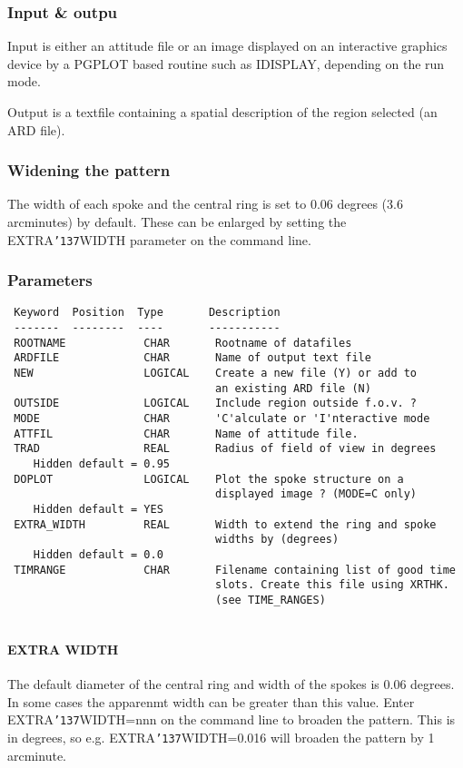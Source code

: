 \documentclass{book}
\renewcommand{\_}{{\tt\char'137}}     %
\begin{document}
\subsubsection{Input \& outpu}
Input is either an attitude file or an image displayed on an
interactive graphics device by a PGPLOT based routine such as IDISPLAY,
depending on the run mode.
 
Output is a textfile containing a spatial description of the region
selected (an ARD file).
 
\subsubsection{Widening the pattern}
The width of each spoke and the central ring is set to 0.06
degrees (3.6 arcminutes) by default. These can be enlarged by setting
the EXTRA\_WIDTH parameter on the command line.
 
\subsubsection{Parameters}
\begin{verbatim}
 Keyword  Position  Type       Description
 -------  --------  ----       -----------
 ROOTNAME            CHAR       Rootname of datafiles
 ARDFILE             CHAR       Name of output text file
 NEW                 LOGICAL    Create a new file (Y) or add to
                                an existing ARD file (N)
 OUTSIDE             LOGICAL    Include region outside f.o.v. ?
 MODE                CHAR       'C'alculate or 'I'nteractive mode
 ATTFIL              CHAR       Name of attitude file.
 TRAD                REAL       Radius of field of view in degrees
    Hidden default = 0.95
 DOPLOT              LOGICAL    Plot the spoke structure on a
                                displayed image ? (MODE=C only)
    Hidden default = YES
 EXTRA_WIDTH         REAL       Width to extend the ring and spoke
                                widths by (degrees)
    Hidden default = 0.0
 TIMRANGE            CHAR       Filename containing list of good time
                                slots. Create this file using XRTHK.
                                (see TIME_RANGES)
 
\end{verbatim}\paragraph{EXTRA WIDTH}
The default diameter of the central ring and width of the
spokes is 0.06 degrees. In some cases the apparenmt width can be greater
than this value. Enter EXTRA\_WIDTH=nnn on the command line to
broaden the pattern. This is in degrees, so e.g. EXTRA\_WIDTH=0.016
will broaden the pattern by 1 arcminute.
 
\end{document}
